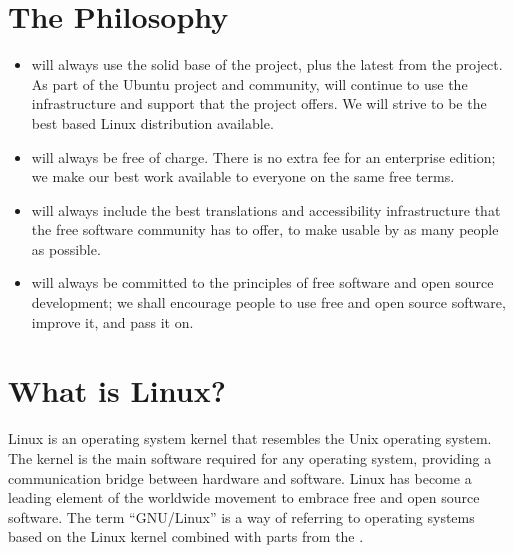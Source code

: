 \documentclass[letterpaper,10pt,english]{sphinxmanual}
\begin{document}
\section{The  Philosophy}
\label{\detokenize{welcome:the-kubuntu-philosophy}}\begin{itemize}
\item {} 
 will always use the solid base of the  project, plus the latest from the  project. As part of the Ubuntu project and community,  will continue to use the infrastructure and support that the  project offers. We will strive to be the best  based Linux distribution available.

\item {} 
 will always be free of charge. There is no extra fee for an enterprise edition; we make our best work available to everyone on the same free terms.

\item {} 
 will always include the best translations and accessibility infrastructure that the free software community has to offer, to make  usable by as many people as possible.

\item {} 
 will always be committed to the principles of free software and open source development; we shall encourage people to use free and open source software, improve it, and pass it on.

\end{itemize}


\section{What is Linux?}
\label{\detokenize{welcome:what-is-linux}}
Linux is an operating system kernel that resembles the Unix operating system. The kernel is the main software required for any operating system, providing a communication bridge between hardware and software. Linux has become a leading element of the worldwide movement to embrace free and open source software. The term “GNU/Linux” is a way of referring to operating systems based on the Linux kernel combined with parts from the .
\end{document}
